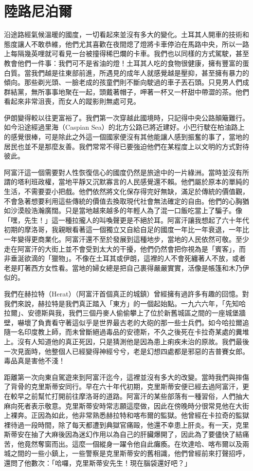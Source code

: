 \chapter{陸路尼泊爾}

沿途路經氣候溫暖的國度，一切看起來並沒有多大的變化。土耳其人開車的技術和態度讓人不敢恭維，他們尤其喜歡在夜間熄了燈將卡車停泊在馬路中央，所以一路上每隔幾英哩就可看見一台被撞得稀巴爛的卡車。我們也以同樣的方式駕駛，甚至教會他們一件事：我們可不是省油的燈！土耳其人吃的食物很健康，擁有豐富的蛋白質。當我們越是往東部前進，所遇見的成年人就感覺越是壓抑，甚至擁有暴力的傾向。那些剃光頭、一臉老成的孩童們則不斷向駛過的車子丟石頭。只見男人們成群結黨，無所事事地聚在一起，頭戴著帽子，呷著一杯又一杯甜中帶澀的茶。他們看起來非常沮喪，而女人的蹤影則無處可見。

伊朗變得較以往更富裕了。我們第一次穿越此國境時，只記得中央公路顛簸難行。如今沿途經過里海（Caspian
Sea）的北方公路已將近建好。小巴行駛在柏油路上的感覺很棒，可是除此之外這一個國家便沒有其他能讓人感到振奮的事了，當地的居民也並不是那麼友善。我們常常不得已要強迫他們在某程度上以文明的方式對待彼此。

阿富汗這一個需要對人性恢復信心的國度仍然是旅途中的一片綠洲。當時並沒有所謂的塔利班政權，當地平靜又沉默寡言的人民感覺還不賴。他們屬於原本的單純的生活，不需要耍小把戲。他們依然將文化保存得完好無缺，滿足於傳統的價值觀，不會急著想要利用這些傳統的價值去換取現代社會無法確定的自由。他們的心胸猶如沙漠般浩瀚廣闊。只是當地越來越多的年輕人為了混一口飯吃當上了騙子。像「嘿，先生！」這一種拉攏人的叫喚聲更是不絕於耳。阿富汗讓我想起了六十年代初期的摩洛哥，我親眼看著這一個獨立又自給自足的國度一年比一年衰退，一年比一年變得更商業化。阿富汗還不至於發展到這種地步，當地的人民依然可敬。至少走在阿富汗的大街上並不會受到太大的干擾，他們仍然會把你視為是「賓客」，而非垂涎欲滴的「獵物」。不像在土耳其或伊朗，這裡的人不會死纏著人不放，或者老是盯著西方女性看。當地的婦女總是把自己裹得嚴嚴實實，活像是帳篷和木乃伊似的。

我們在赫拉特（Herat）（阿富汗首個真正的城鎮）曾經擁有過許多有趣的回憶。對我們來說，赫拉特是我們真正踏入「東方」的一個起始點。一九六六年，「先知哈拉爾」、安德斯與我，我們三個丹麥人偷偷攀上了位於新舊城區之間的一座城堡牆壁，嚇壞了負責看守著這似乎是世界最古老的大砲的那一些士兵們。如今哈拉爾追隨一名印度教上師，而未曾斷絕過毒品的安德斯，不久之後死在卡拉奇某處的糞堆上。沒有人知道他的真正死因，只是猜測他是因為患上痢疾未治的原故。我們最後一次見面時，他整個人已經變得神經兮兮，老是幻想四處都是邪惡的吉普賽女郎。毒品真是害他不淺！

距離第一次向東自駕遊來到阿富汗迄今，這裡並沒有多大的改變。當時我們與摔傷了背骨的克里斯蒂安同行。早在六十年代初期，克里斯蒂安便已經去過阿富汗，更在較早之前幫忙打開前往摩洛哥的道路。阿富汗的某些部落有一種習俗，人們抽大麻向死者表示敬意。克里斯蒂安時常志願這麼做，因此在傍晚時分很常見他在大街上裸奔。正因為如此，他非常熟悉赫拉特和喀布爾的監獄。他曾經在卡拉奇的監獄裡待過一段時間，除了每天都遭到典獄官痛毆，他還不幸患上肝炎。有一天，克里斯蒂安在抽了大麻後因為迷幻作用以為自己的肝臟爆開了，因此為了要儘快了結痛苦，他竟然奪窗而出。這麼一個縱身一躍令他自此癱瘓。在坎達哈、喀布爾以及兩城之間的一些小鎮上，一些警察是克里斯蒂安的舊相識，他們曾經前來打聲招呼，還問了他數次：「哈囉，克里斯蒂安先生！現在腦袋還好吧？」

